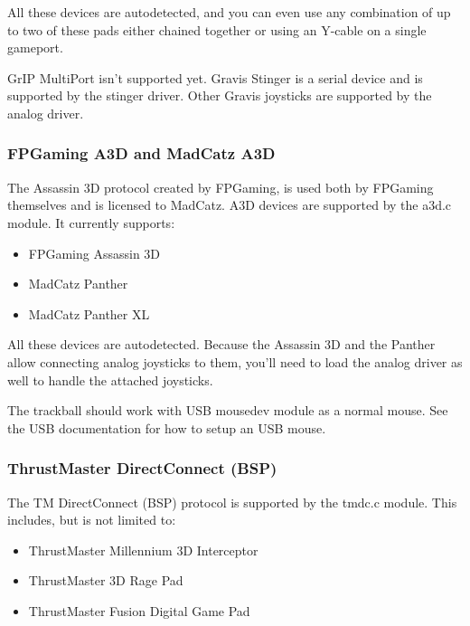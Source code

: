 \documentclass[a4paper,8pt,english]{sphinxmanual}
\begin{document}
All these devices are autodetected, and you can even use any combination
of up to two of these pads either chained together or using an Y-cable on a
single gameport.

GrIP MultiPort isn't supported yet. Gravis Stinger is a serial device and is
supported by the stinger driver. Other Gravis joysticks are supported by the
analog driver.


\subsubsection{FPGaming A3D and MadCatz A3D}
\label{input/joydev/joystick:fpgaming-a3d-and-madcatz-a3d}
The Assassin 3D protocol created by FPGaming, is used both by FPGaming
themselves and is licensed to MadCatz. A3D devices are supported by the
a3d.c module. It currently supports:
\begin{itemize}
\item {} 
FPGaming Assassin 3D

\item {} 
MadCatz Panther

\item {} 
MadCatz Panther XL

\end{itemize}

All these devices are autodetected. Because the Assassin 3D and the Panther
allow connecting analog joysticks to them, you'll need to load the analog
driver as well to handle the attached joysticks.

The trackball should work with USB mousedev module as a normal mouse. See
the USB documentation for how to setup an USB mouse.


\subsubsection{ThrustMaster DirectConnect (BSP)}
\label{input/joydev/joystick:thrustmaster-directconnect-bsp}
The TM DirectConnect (BSP) protocol is supported by the tmdc.c
module. This includes, but is not limited to:
\begin{itemize}
\item {} 
ThrustMaster Millennium 3D Interceptor

\item {} 
ThrustMaster 3D Rage Pad

\item {} 
ThrustMaster Fusion Digital Game Pad

\end{itemize}
\end{document}
